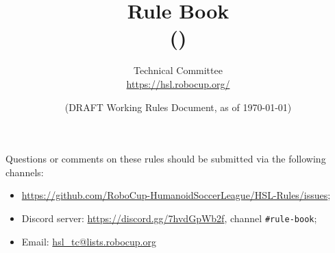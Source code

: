 \documentclass[12pt]{article}
\title{Rule Book\\\leaguename (\leaguenameabbr)}
\author{\leaguename Technical Committee\\\url{https://hsl.robocup.org/}}
\date{(DRAFT \RCYear Working Rules Document, as of \today)}
\begin{document}

\maketitle
\thispagestyle{empty}

\begin{center}
  Questions or comments on these rules should be submitted via the following channels:
  \begin{itemize}
      \item \url{https://github.com/RoboCup-HumanoidSoccerLeague/HSL-Rules/issues};
      \item Discord server: \url{https://discord.gg/7hvdGpWb2f}, channel \texttt{\#rule-book};
      \item Email: \url{hsl_tc@lists.robocup.org}
  \end{itemize}
\end{center}

\newpage
\setcounter{tocdepth}{2}
\tableofcontents

\thispagestyle{fancy}

\clearpage
{}
\setcounter{page}{1}

\newpage


\newpage


\newpage


\newpage


\newpage


\newpage

%


\newpage


\newpage


\newpage

\appendix
%


\end{document}
